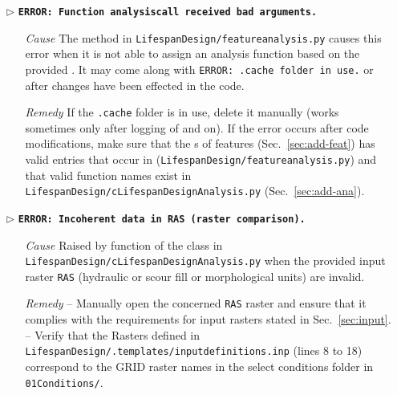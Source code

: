 \begin{itemize}
	\item[$\triangleright$] \textbf{\texttt{ERROR: Function analysis{\myUnderscore}call received bad arguments.}}
	\begin{itemize}
		\item[\textit{Cause}\hspace{0.27cm}] The  method in \texttt{LifespanDesign/feature{\myUnderscore}analysis.py} causes this error when it is not able to assign an analysis function based on the provided . It may come along with \texttt{ERROR: .cache folder in use.} or after changes have been effected in the code.
		\item[\textit{Remedy}] If the \texttt{.cache} folder is in use, delete it manually (works sometimes only after logging of and on). If the error occurs after code modifications, make sure that the s of features (Sec.~\ref{sec:add-feat}) has valid entries that occur in  (\texttt{LifespanDesign/feature{\myUnderscore}analysis.py}) and that valid function names exist in \texttt{LifespanDesign/cLifespanDesignAnalysis.py} (Sec.~\ref{sec:add-ana}).\\
	\end{itemize}
	
	\item[$\triangleright$]\textbf{\texttt{ERROR: Incoherent data in RAS (raster comparison).}}
	\begin{itemize}
		\item[\textit{Cause}\hspace{0.27cm}] Raised by  function of the  class in \texttt{LifespanDesign/cLifespanDesignAnalysis.py} when the provided input raster \texttt{RAS} (hydraulic or scour fill or morphological units) are invalid.
		\item[\textit{Remedy}] --  Manually open the concerned \texttt{RAS} raster and ensure that it complies with the requirements for input rasters stated in Sec.~\ref{sec:input}.\\
						 --  Verify that the Rasters defined in \texttt{LifespanDesign/.templates/input{\myUnderscore}definitions.inp} (lines 8 to 18) correspond to the GRID raster names in the select conditions folder in \texttt{01{\myUnderscore}Conditions/}.\\
	\end{itemize}	
	

\end{itemize}
